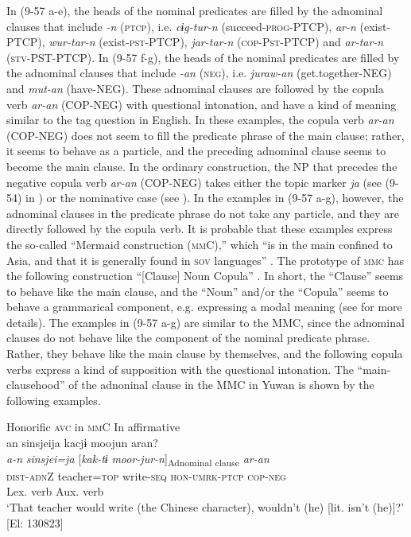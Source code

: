 In (9-57 a-e), the heads of the nominal predicates are filled by the adnominal clauses that include \textit{-n} (\textsc{ptcp}), i.e. \textit{cɨg-tur-n} (succeed-\textsc{prog}-PTCP), \textit{ar-n} (exist-PTCP), \textit{wur-tar-n} (exist-\textsc{pst}-PTCP), \textit{jar-tar-n} (\textsc{cop}-P\textsc{st}-PTCP) and \textit{ar-tar-n} (\textsc{stv}-PST-PTCP). In (9-57 f-g), the heads of the nominal predicates are filled by the adnominal clauses that include \textit{-an} (\textsc{neg}), i.e. \textit{juraw-an} (get.together-NEG) and \textit{mut-an} (have-NEG). These adnominal clauses are followed by the copula verb \textit{ar-an} (COP-NEG) with questional intonation, and have a kind of meaning similar to the tag question in English. In these examples, the copula verb \textit{ar-an} (COP-NEG) does not seem to fill the predicate phrase of the main clause; rather, it seems to behave as a particle, and the preceding adnominal clause seems to become the main clause. In the ordinary construction, the NP that precedes the negative copula verb \textit{ar-an} (COP-NEG) takes either the topic marker \textit{ja} (see (9-54) in ) or the nominative case (see ). In the examples in (9-57 a-g), however, the adnominal clauses in the predicate phrase do not take any particle, and they are directly followed by the copula verb. It is probable that these examples express the so-called “Mermaid construction (\textsc{mm}C),” which “is in the main confined to Asia, and that it is generally found in \textsc{sov} languages” \citep[25]{Tsunoda2013}. The prototype of \textsc{mmc} has the following construction “[Clause] Noun Copula” \citep[16]{Tsunoda2013}. In short, the “Clause” seems to behave like the main clause, and the “Noun” and/or the “Copula” seems to behave a grammarical component, e.g. expressing a modal meaning (see \citealt{Tsunoda2013} for more details). The examples in (9-57 a-g) are similar to the MMC, since the adnominal clauses do not behave like the component of the nominal predicate phrase. Rather, they behave like the main clause by themselves, and the following copula verbs express a kind of supposition with the questional intonation. The “main-clausehood” of the adnoninal clause in the MMC in Yuwan is shown by the following examples.

\ea   Honorific \textsc{avc} in \textsc{mm}C \label{ex:9.58}
\ea In affirmative\\
 \gllll  an  sinsjeija  kacjɨ  moojun  aran?\\
    \textit{a-n}  \textit{sinsjei=ja}  [\textit{kak-tɨ}  \textit{moor-jur-n}]\textsubscript{Adnominal clause}  \textit{ar-an}\\
    \textsc{dist}-\textsc{adn}Z  teacher=\textsc{top}  write-\textsc{seq}  \textsc{hon}-\textsc{umrk}-\textsc{ptcp}  \textsc{cop}-\textsc{neg}\\
    {}  {}  {Lex. verb}  {Aux. verb}\\
    \glt     ‘That teacher would write (the Chinese character), wouldn’t (he) [lit. isn’t (he)]?’ [El: 130823]


